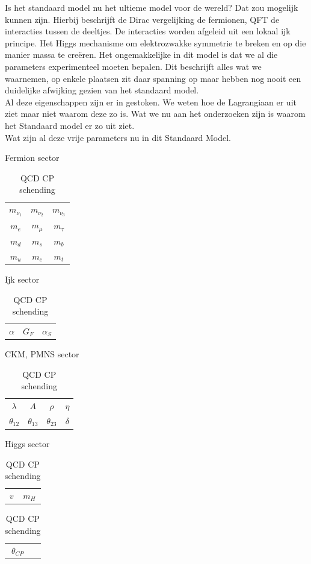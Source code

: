 \documentclass[../main.tex]{subfiles}
\begin{document}
Is het standaard model nu het ultieme model voor de wereld? Dat zou mogelijk kunnen zijn. Hierbij beschrijft de Dirac vergelijking de fermionen, QFT de interacties tussen de deeltjes. De interacties worden afgeleid uit een lokaal ijk principe. Het Higgs mechanisme om elektrozwakke symmetrie te breken en op die manier massa te creëren. Het ongemakkelijke in dit model is dat we al die parameters experimenteel moeten bepalen. Dit beschrijft alles wat we waarnemen, op enkele plaatsen zit daar spanning op maar hebben nog nooit een duidelijke afwijking gezien van het standaard model.\\
Al deze eigenschappen zijn er in gestoken. We weten hoe de Lagrangiaan er uit ziet maar niet waarom deze zo is. Wat we nu aan het onderzoeken zijn is waarom het Standaard model er zo uit ziet.\\
Wat zijn al deze vrije parameters nu in dit Standaard Model.
\begin{table}[h]
    \begin{minipage}[c]{0.48\textwidth}
        \centering
        \caption{Fermion sector}
        \label{tab:fermion_sector_parameters}
        \begin{tabular}{ccc}
            $m_{\nu_{1}}$   & $m_{\nu_{2}}$ & $m_{\nu_{3}}$ \\
            $m_{e}$         & $m_{\mu}$     & $m_{\tau}$ \\
            $m_{d}$         & $m_{s}$       & $m_{b}$ \\
            $m_{u}$         & $m_{c}$       & $m_{t}$
        \end{tabular}
        
        \caption{Ijk sector}
        \label{tab:ijk_sector}
        \begin{tabular}{ccc}
            $\alpha$ & $G_F$ & $\alpha_S$
        \end{tabular}
    \end{minipage}
    \begin{minipage}[c]{0.48\textwidth}
        \centering
        \caption{CKM, PMNS sector}
        \label{tab:ckm_pmns_sector}
        \begin{tabular}{cccc}
            $\lambda$       & $A$           & $\rho$        & $\eta$ \\
            $\theta_{12}$   & $\theta_{13}$ & $\theta_{23}$ & $\delta$
        \end{tabular}
        
        \caption{Higgs sector}
        \label{tab:higgs_sector}
        \begin{tabular}{cc}
            $v$ & $m_H$
        \end{tabular}

        \caption{QCD CP schending}
        \label{tab:qcd_cp_schending}
        \begin{tabular}{cc}
            $\theta_{CP}$
        \end{tabular}
    \end{minipage}
\end{table}
\end{document}
